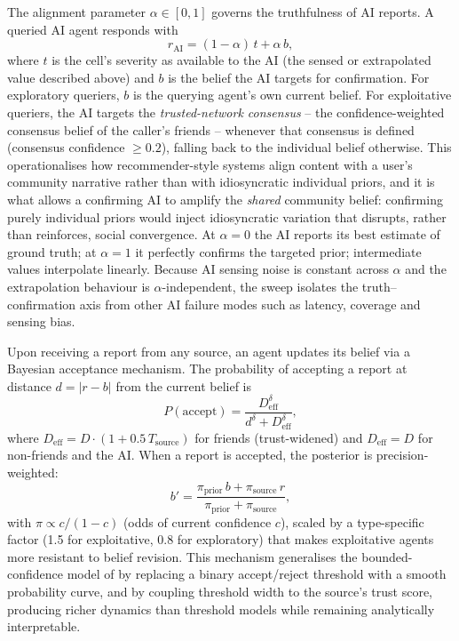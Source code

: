 \documentclass[pdflatex,sn-basic]{sn-jnl}
\begin{document}
The alignment parameter $\alpha \in [0, 1]$ governs the truthfulness of AI reports. A queried AI agent responds with
\begin{equation}
r_{\text{AI}} = (1 - \alpha)\, t + \alpha\, b,
\label{eq:alignment}
\end{equation}
where $t$ is the cell's severity as available to the AI (the sensed or extrapolated value described above) and $b$ is the belief the AI targets for confirmation. For exploratory queriers, $b$ is the querying agent's own current belief. For exploitative queriers, the AI targets the \emph{trusted-network consensus} -- the confidence-weighted consensus belief of the caller's friends -- whenever that consensus is defined (consensus confidence $\geq 0.2$), falling back to the individual belief otherwise. This operationalises how recommender-style systems align content with a user's community narrative rather than with idiosyncratic individual priors, and it is what allows a confirming AI to amplify the \emph{shared} community belief: confirming purely individual priors would inject idiosyncratic variation that disrupts, rather than reinforces, social convergence. At $\alpha = 0$ the AI reports its best estimate of ground truth; at $\alpha = 1$ it perfectly confirms the targeted prior; intermediate values interpolate linearly. Because AI sensing noise is constant across $\alpha$ and the extrapolation behaviour is $\alpha$-independent, the sweep isolates the truth--confirmation axis from other AI failure modes such as latency, coverage and sensing bias.

Upon receiving a report from any source, an agent updates its belief via a Bayesian acceptance mechanism. The probability of accepting a report at distance $d = |r - b|$ from the current belief is
\begin{equation}
P(\text{accept}) = \frac{D_{\text{eff}}^{\delta}}{d^{\delta} + D_{\text{eff}}^{\delta}},
\label{eq:accept}
\end{equation}
where $D_{\text{eff}} = D \cdot (1 + 0.5\, T_{\text{source}})$ for friends (trust-widened) and $D_{\text{eff}} = D$ for non-friends and the AI. When a report is accepted, the posterior is precision-weighted:
\begin{equation}
b' = \frac{\pi_{\text{prior}}\, b + \pi_{\text{source}}\, r}{\pi_{\text{prior}} + \pi_{\text{source}}},
\label{eq:posterior}
\end{equation}
with $\pi \propto c/(1-c)$ (odds of current confidence $c$), scaled by a type-specific factor (1.5 for exploitative, 0.8 for exploratory) that makes exploitative agents more resistant to belief revision. This mechanism generalises the bounded-confidence model of \citet{deffuant2000mixing} by replacing a binary accept/reject threshold with a smooth probability curve, and by coupling threshold width to the source's trust score, producing richer dynamics than threshold models while remaining analytically interpretable.
\end{document}
